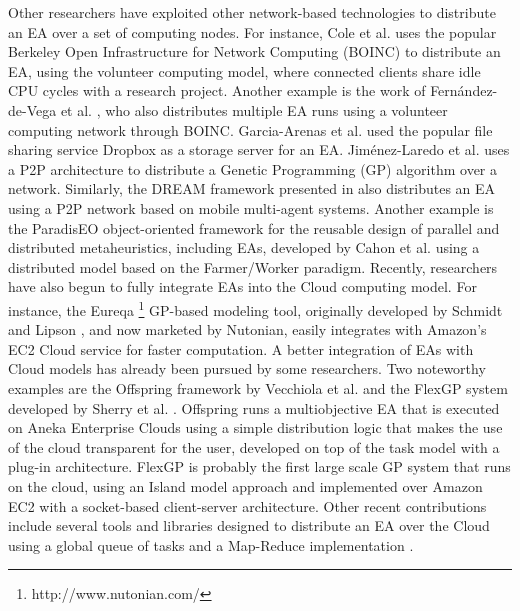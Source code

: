 Other researchers have exploited other network-based technologies to distribute an EA over a set of computing nodes.
For instance, Cole et al. \cite{MilkyWay} uses the popular Berkeley Open Infrastructure for Network Computing (BOINC) to distribute an EA,
using the volunteer computing model, where connected clients share idle CPU cycles with a research project.
Another example is the work of Fern\'andez-de-Vega et al. \cite{nc}, who also distributes multiple EA runs using a volunteer computing network through BOINC.
Garcia-Arenas et al. \cite{garcia2011} used the popular file sharing service Dropbox as a storage server for an EA.
Jim\'enez-Laredo et al. \cite{garcia2011} uses a P2P architecture to distribute a Genetic Programming (GP) algorithm over a network.
Similarly, the DREAM framework presented in \cite{DREAM} also distributes an EA using a P2P network based on mobile multi-agent systems.
Another example is the ParadisEO object-oriented framework for the reusable design of parallel and distributed metaheuristics, including EAs, developed
by Cahon et al. \cite{ParadisEO} using a distributed model based on the Farmer/Worker paradigm.
Recently, researchers have also begun to fully integrate EAs into the Cloud computing model.
For instance, the Eureqa \footnote{http://www.nutonian.com/} GP-based modeling tool, originally developed by Schmidt and Lipson \cite{free-form},
and now marketed by Nutonian, easily integrates with Amazon's EC2 Cloud service for faster computation.
A better integration of EAs with Cloud models has already been pursued by some researchers.
Two noteworthy examples are the Offspring framework by Vecchiola et al. \cite{VecchiolaCORR}
and the FlexGP system developed by Sherry et al. \cite{FlexGP}.
Offspring runs a multiobjective EA that is executed on Aneka Enterprise Clouds using a simple distribution logic that makes the use of the cloud
transparent for the user, developed on top of the task model with a plug-in architecture.
FlexGP is probably the first large scale GP system that runs on the cloud, using an Island model approach and implemented over
Amazon EC2 with a socket-based client-server architecture.
Other recent contributions include several tools and libraries designed to distribute an EA over the Cloud using a global queue of tasks and a Map-Reduce
implementation \cite{FlexGP}.


